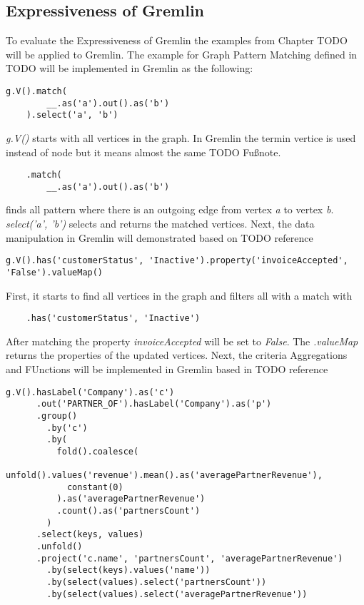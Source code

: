 \subsection{Expressiveness of Gremlin}
\label{subsec:different_query_languages_for_graph_databases:gremlin:expressiveness}
To evaluate the Expressiveness of Gremlin the examples from Chapter TODO will be 
applied to Gremlin.
The example for Graph Pattern Matching defined in TODO will be implemented in Gremlin as the following:
\begin{lstlisting}[caption={Graph Pattern Matching in Gremlin}, label={lst:simpleGPMGremlin}]
	g.V().match(
		__.as('a').out().as('b')
	).select('a', 'b')
\end{lstlisting}
\textit{g.V()} starts with all vertices in the graph. In Gremlin the termin vertice is used
instead of node but it means almost the same TODO Fußnote.
\begin{lstlisting}
	.match(
		__.as('a').out().as('b')
\end{lstlisting}
finds all pattern where there is an outgoing edge
from vertex \textit{a} to vertex \textit{b}.
\textit{select('a', 'b')} selects and returns the matched vertices.
Next, the data manipulation in Gremlin will demonstrated based on TODO reference 
\begin{lstlisting}[caption={Updating Vertex Properties in Gremlin}, label={lst:updateGremlin}]
	g.V().has('customerStatus', 'Inactive').property('invoiceAccepted', 'False').valueMap()
\end{lstlisting}
First, it starts to find all vertices in the graph and filters all with a match with
\begin{lstlisting}
	.has('customerStatus', 'Inactive')
\end{lstlisting}
After matching the property \textit{invoiceAccepted} will be set to \textit{False}.
The \textit{.valueMap} returns the properties of the updated vertices.
Next, the criteria Aggregations and FUnctions will be implemented in Gremlin based in TODO reference
\begin{lstlisting}[caption={Aggregation and Functions in Gremlin with Company Nodes}, label={lst:companyAggregationFunctionsGremlin}]
	g.V().hasLabel('Company').as('c')
	  .out('PARTNER_OF').hasLabel('Company').as('p')
	  .group()
	    .by('c')
	    .by(
	      fold().coalesce(
	        unfold().values('revenue').mean().as('averagePartnerRevenue'),
	        constant(0)
	      ).as('averagePartnerRevenue')
	      .count().as('partnersCount')
	    )
	  .select(keys, values)
	  .unfold()
	  .project('c.name', 'partnersCount', 'averagePartnerRevenue')
	    .by(select(keys).values('name'))
	    .by(select(values).select('partnersCount'))
	    .by(select(values).select('averagePartnerRevenue'))
\end{lstlisting}
